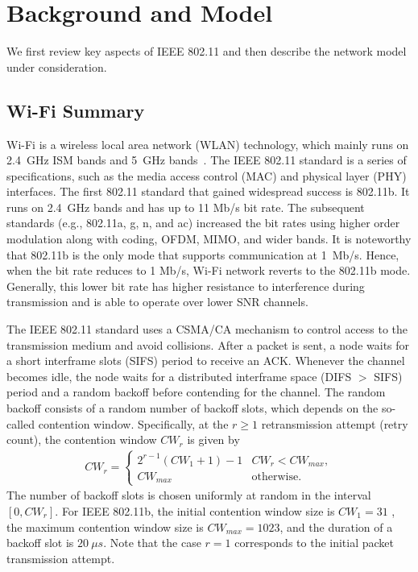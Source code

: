 \documentclass{IEEEtran}
\begin{document}
\section{Background and Model}
\label{Background}
We first review key aspects of IEEE 802.11 and then describe the network model under consideration.

\subsection{Wi-Fi Summary}
\label{Wi-Fi Summary}
Wi-Fi is a wireless local area network (WLAN) technology, which mainly
runs on 2.4~GHz ISM bands and 5~GHz bands~\cite{gast2005802}. The IEEE 802.11 standard is a
series of specifications, such as the media access control (MAC) and
physical layer (PHY) interfaces. The first 802.11 standard
that gained widespread success is 802.11b.
It runs on 2.4~GHz bands and
has up to 11 Mb/s bit rate.
The subsequent standards (e.g., 802.11a, g, n, and
ac) increased the bit rates using higher order modulation along with
coding, OFDM, MIMO, and wider bands.
It is noteworthy
that 802.11b is the only mode that supports communication at 1~Mb/s. Hence, when the
bit rate reduces to 1 Mb/s, Wi-Fi network reverts to the
802.11b mode. Generally, this lower bit rate has higher resistance to
interference during transmission and is able to operate over lower SNR channels.

The IEEE 802.11 standard uses a CSMA/CA mechanism to control access to
the transmission medium and avoid collisions.
After a packet is sent, a
node waits for a short interframe slots (SIFS) period to receive an
ACK. Whenever the channel becomes idle, the node waits for a distributed
interframe space (DIFS $>$ SIFS) period and a random backoff before contending for the channel.
The random backoff consists of a random number of backoff slots, which depends on the so-called contention window.
Specifically, at the $r \geq 1$ retransmission attempt (retry count), the contention window $CW_r$ is given by
\begin{eqnarray}
CW_r = \left\lbrace
	\begin{array}{ll}
		2^{r-1} (CW_1 + 1) - 1   & CW_r < CW_{max}, \\
		CW_{max}  & \text{otherwise}.
	\end{array}
\right.\label{eq:back-off}
\end{eqnarray}
The number of backoff slots is chosen uniformly at random in the interval $[0, CW_r]$.
For IEEE 802.11b, the initial contention window size is $CW_1 = 31$ , the maximum contention window size is $CW_{max} = 1023$, and the duration of a
backoff slot is $20~\mu s$.
Note that the case $r=1$ corresponds to the initial packet transmission attempt. 
\end{document}
